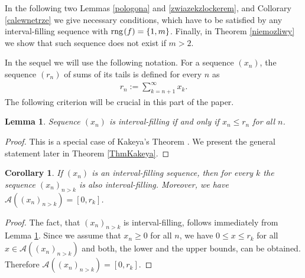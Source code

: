 \documentclass{amsart}
\newtheorem{lemma}[theorem]{Lemma}
\newtheorem{corollary}[theorem]{Corollary}
\theoremstyle{definition}
\newcommand{\rng}{{\rm rng} \hspace{0.03cm}}
\begin{document}
In the following two Lemmas \ref{pologona} and \ref{zwiazekzlockerem}, and Collorary \ref{calewnetrze} we give necessary conditions, which have to be satisfied by any interval-filling sequence with $\rng(f)=\{1,m\}$. Finally, in Theorem \ref{niemozliwy} we show that such sequence does not exist if $m>2$.




In the sequel we will use the following notation.  For a sequence $(x_{n})$, the sequence $(r_{n})$ of sums of its tails is defined for every $n$ as
\begin{align*}
r_{n}:=\sum_{k=n+1}^{\infty}x_{k}.
\end{align*}
The following criterion will be crucial in this part of the paper.

\begin{lemma}\label{LemCritIntervFill}
Sequence $(x_{n})$ is interval-filling if and only if $x_{n}\leq r_{n}$ for all $n$.
\end{lemma}
\begin{proof}
This is a special case of Kakeya's Theorem \cite{Kakeya}. We present the general statement later in Theorem \ref{ThmKakeya}.
\end{proof}


\begin{corollary}\label{CorIntFillA}
If $(x_{n})$ is an interval-filling sequence, then for every $k$ the sequence $(x_{n})_{n>k}$ is also interval-filling. Moreover, we have $\mathcal{A}((x_{n})_{n>k}) = [0,r_{k}]$.
\end{corollary}
\begin{proof}
The fact, that $(x_{n})_{n>k}$ is interval-filling, follows immediately from Lemma \ref{LemCritIntervFill}. Since we assume that $x_{n}\geq 0$ for all $n$, we have $0\leq x\leq r_{k}$ for all $x\in\mathcal{A}((x_{n})_{n>k})$ and both, the lower and the upper bounds, can be obtained. Therefore $\mathcal{A}((x_{n})_{n>k})=[0,r_{k}]$.
\end{proof}
\end{document}
